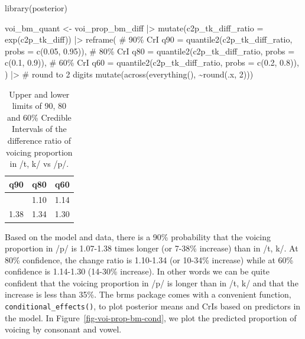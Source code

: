 \documentclass[
  authoryear,
  preprint,
  3p]{elsarticle}
\newenvironment{Shaded}{\begin{snugshade}}{\end{snugshade}}
\newcommand{\AttributeTok}[1]{\textcolor[rgb]{0.40,0.45,0.13}{#1}}
\newcommand{\CommentTok}[1]{\textcolor[rgb]{0.37,0.37,0.37}{#1}}
\newcommand{\DecValTok}[1]{\textcolor[rgb]{0.68,0.00,0.00}{#1}}
\newcommand{\FloatTok}[1]{\textcolor[rgb]{0.68,0.00,0.00}{#1}}
\newcommand{\FunctionTok}[1]{\textcolor[rgb]{0.28,0.35,0.67}{#1}}
\newcommand{\NormalTok}[1]{\textcolor[rgb]{0.00,0.23,0.31}{#1}}
\newcommand{\OtherTok}[1]{\textcolor[rgb]{0.00,0.23,0.31}{#1}}
\newcommand{\SpecialCharTok}[1]{\textcolor[rgb]{0.37,0.37,0.37}{#1}}
\begin{document}
\begin{Shaded}
\begin{Highlighting}[]
\FunctionTok{library}\NormalTok{(posterior)}

\NormalTok{voi\_bm\_quant }\OtherTok{\textless{}{-}}\NormalTok{ voi\_prop\_bm\_diff }\SpecialCharTok{|\textgreater{}} 
  \FunctionTok{mutate}\NormalTok{(}\AttributeTok{c2p\_tk\_diff\_ratio =} \FunctionTok{exp}\NormalTok{(c2p\_tk\_diff)) }\SpecialCharTok{|\textgreater{}} 
  \FunctionTok{reframe}\NormalTok{(}
    \CommentTok{\# 90\% CrI}
    \AttributeTok{q90 =} \FunctionTok{quantile2}\NormalTok{(c2p\_tk\_diff\_ratio, }\AttributeTok{probs =} \FunctionTok{c}\NormalTok{(}\FloatTok{0.05}\NormalTok{, }\FloatTok{0.95}\NormalTok{)),}
    \CommentTok{\# 80\% CrI}
    \AttributeTok{q80 =} \FunctionTok{quantile2}\NormalTok{(c2p\_tk\_diff\_ratio, }\AttributeTok{probs =} \FunctionTok{c}\NormalTok{(}\FloatTok{0.1}\NormalTok{, }\FloatTok{0.9}\NormalTok{)),}
    \CommentTok{\# 60\% CrI}
    \AttributeTok{q60 =} \FunctionTok{quantile2}\NormalTok{(c2p\_tk\_diff\_ratio, }\AttributeTok{probs =} \FunctionTok{c}\NormalTok{(}\FloatTok{0.2}\NormalTok{, }\FloatTok{0.8}\NormalTok{)),}
\NormalTok{  ) }\SpecialCharTok{|\textgreater{}} 
  \CommentTok{\# round to 2 digits}
  \FunctionTok{mutate}\NormalTok{(}\FunctionTok{across}\NormalTok{(}\FunctionTok{everything}\NormalTok{(), }\SpecialCharTok{\textasciitilde{}}\FunctionTok{round}\NormalTok{(.x, }\DecValTok{2}\NormalTok{)))}
\end{Highlighting}
\end{Shaded}

\begin{longtable}[]{@{}rrr@{}}

\caption{\label{tbl-voi-bm-quant}Upper and lower limits of 90, 80 and
60\% Credible Intervals of the difference ratio of voicing proportion in
/t, k/ vs /p/.}

\tabularnewline

\toprule\noalign{}
q90 & q80 & q60 \\
\midrule\noalign{}
\endhead
\bottomrule\noalign{}
\endlastfoot
1.07 & 1.10 & 1.14 \\
1.38 & 1.34 & 1.30 \\

\end{longtable}

Based on the model and data, there is a 90\% probability that the
voicing proportion in /p/ is 1.07-1.38 times longer (or 7-38\% increase)
than in /t, k/. At 80\% confidence, the change ratio is 1.10-1.34 (or
10-34\% increase) while at 60\% confidence is 1.14-1.30 (14-30\%
increase). In other words we can be quite confident that the voicing
proportion in /p/ is longer than in /t, k/ and that the increase is less
than 35\%. The brms package comes with a convenient function,
\texttt{conditional\_effects()}, to plot posterior means and CrIs based
on predictors in the model. In Figure~\ref{fig-voi-prop-bm-cond}, we
plot the predicted proportion of voicing by consonant and vowel.
\end{document}
